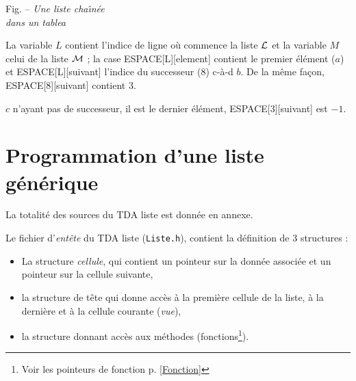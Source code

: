 \begin{multicols}{2}
\begin{figurette}
	
\medskip
\centerline{{\sc Fig.} \thesection -- {\it Une liste cha\^\i n\'ee\\ dans un tablea}}
	\label{lfauxp}
\end{figurette}

	La variable $L$ contient l'indice de ligne o\`u commence la liste ${\cal L}$
	et la variable $M$ celui de la liste ${\cal M}$ ; la case
	ESPACE[L][element] contient le premier \'el\'ement ($a$) et ESPACE[L][suivant]
	l'indice du successeur (8) c-\`a-d $b$. De la m\^eme fa\c con, ESPACE[8][suivant]
	contient 3.

	$c$ n'ayant pas de successeur, il est le dernier \'el\'ement,
	ESPACE[3][su\-i\-vant] est $-1$.
\end{multicols}
\newpage
\section*{Programmation d'une liste g\'en\'erique}

La totalit\'e des sources du TDA liste est donn\'ee en annexe.

Le fichier d'{\it ent\^ete} du TDA liste ({\tt Liste.h}),
contient la d\'efinition de 3 structures : 

\begin{itemize} 
\item La structure  {\it cellule}, qui contient un pointeur sur la donn\'ee
associ\'ee et un pointeur sur la  cellule suivante,

\item la structure de t\^ete qui donne acc\`es \`a la premi\`ere cellule de la liste,
\`a la derni\`ere et \`a la cellule courante ({\it vue}),

\item la structure donnant acc\`es aux m\'ethodes (fonctions\footnote{Voir les
pointeurs de fonction p. \ref{Fonction}}).
\end{itemize} 
{\small
{}}
